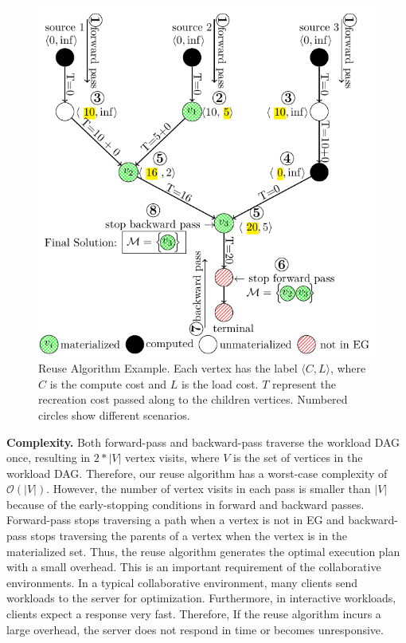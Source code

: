 \begin{figure}
\centering
\includegraphics[width=\linewidth]{../images/tikz-standalone/reuse-algorithm}
\caption{Reuse Algorithm Example. Each vertex has the label $\langle C,L \rangle$, where $C$ is the compute cost and $L$ is the load cost. $T$ represent the recreation cost passed along to the children vertices. Numbered circles show different scenarios.}
\label{fig-reuse-algorithm}
\end{figure}

\textbf{Complexity.} 
Both forward-pass and backward-pass traverse the workload DAG once, resulting in $2*|V|$ vertex visits, where $V$ is the set of vertices in the workload DAG.
Therefore, our reuse algorithm has a worst-case complexity of $\mathcal{O}(|V|)$.
However, the number of vertex visits in each pass is smaller than $|V|$ because of the early-stopping conditions in forward and backward passes.
Forward-pass stops traversing a path when a vertex is not in EG and backward-pass stops traversing the parents of a vertex when the vertex is in the materialized set.
Thus, the reuse algorithm generates the optimal execution plan with a small overhead.
This is an important requirement of the collaborative environments.
In a typical collaborative environment, many clients send workloads to the server for optimization.
Furthermore, in interactive workloads, clients expect a response very fast.
Therefore, If the reuse algorithm incurs a large overhead, the server does not respond in time or becomes unresponsive.

